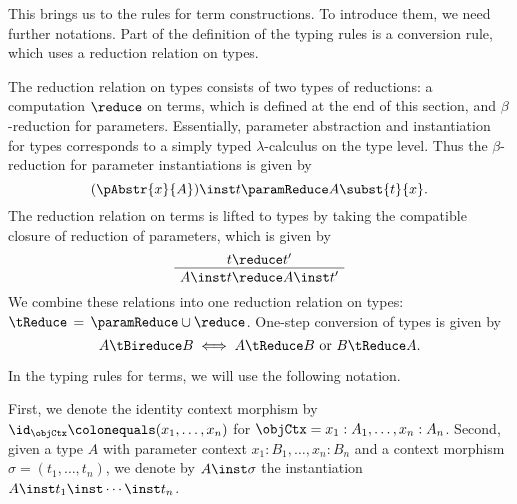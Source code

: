 \documentclass[preprint]{sigplanconf}
\begin{document}
This brings us to the rules for term constructions.
To introduce them, we need further notations.
Part of the definition of the typing rules is a conversion rule,
which uses a reduction relation on types.
\begin{definition}
  The reduction relation on types consists of two types of reductions: a
  computation $\reduce$ on terms, which is defined at the end of this
  section, and $\beta$-reduction for parameters.  Essentially,
  parameter abstraction and instantiation for types corresponds to a
  simply typed $\lambda$-calculus on the type level.  Thus the
  $\beta$-reduction for parameter instantiations is given by
  \begin{equation*}
    (\pAbstr{x}{A}) \inst t \paramReduce A \subst{t}{x}.
  \end{equation*}
  The reduction relation on terms is lifted to types by taking the
  compatible closure of reduction of parameters, which is given by
  \begin{equation}
    \label{eq:ty-reduction}
    \AxiomC{$t \reduce t'$}
    \UnaryInfC{$A \inst t \reduce A \inst t'$}
    \DisplayProof
  \end{equation}
We combine these relations into one reduction relation on types:
  $\tReduce \, = \, \paramReduce \cup \reduce$.
  One-step conversion of types is given by
  \begin{equation}
    A \tBireduce B \iff A \tReduce B \text{ or } B \tReduce A.
  \end{equation}
\end{definition}

In the typing rules for terms, we will use the following notation.
\begin{notation}
  First, we denote the identity context morphism by
  $\id_\objCtx \colonequals (x_1, \dotsc, x_n)$ for
  $\objCtx = x_1 : A_1, \dotsc, x_n : A_n$.
  Second, given a type $A$ with parameter context
  $x_1 : B_1, \dotsc, x_n : B_n$ and a context
  morphism $\sigma = (t_1, \dotsc, t_n)$, we denote by $A \inst \sigma$
  the instantiation $A \inst t_1 \inst \dotsm \inst t_n$.
\end{notation}
\end{document}

